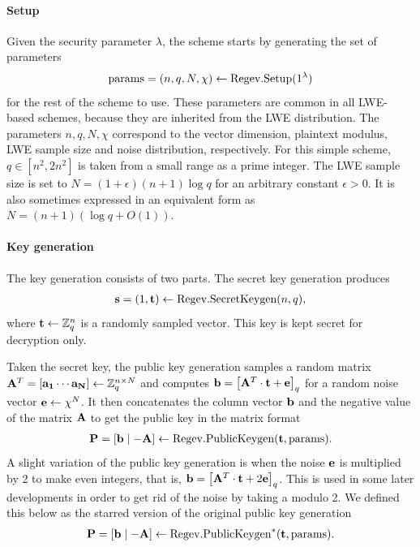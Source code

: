 \documentclass[../main.tex]{subfiles}
\begin{document}
\paragraph{Setup} Given the security parameter $\lambda$, the scheme starts by generating the set of parameters 
\begin{align*}
    \text{params}=(n,q,N,\chi) \leftarrow \text{Regev}.\text{Setup}(1^{\lambda})
\end{align*}
for the rest of the scheme to use. These parameters are common in all LWE-based schemes, because they are inherited from the LWE distribution. The parameters  $n,q,N,\chi$ correspond to the vector dimension, plaintext modulus, LWE sample size and noise distribution, respectively. For this simple scheme, $q \in [n^2, 2n^2]$ is taken from a small range as a prime integer. %
The LWE sample size is set to $N=(1+\epsilon)(n+1)\log q$ for an arbitrary constant $\epsilon >0$. It is also sometimes expressed in an equivalent form as $N=(n+1)(\log q+O(1))$.

\paragraph{Key generation} The key generation consists of two parts. The secret key generation produces 
\begin{align*}
    \mathbf{s}=(1,\mathbf{t}) \leftarrow \text{Regev}.\text{SecretKeygen}(n,q),
\end{align*}
where $\mathbf{t} \leftarrow \mathbb{Z}_q^n$ is a randomly sampled vector. This key is kept secret for decryption only. 

Taken the secret key, the public key generation samples a random matrix $\mathbf{A}^T = \left[\mathbf{a_1} \cdots \mathbf{a_N}\right] \leftarrow \mathbb{Z}_q^{n \times N}$ and computes $\mathbf{b} = \left[{\mathbf{A}^T \cdot \mathbf{t} + \mathbf{e}}\right]_q$ for a random noise vector $\mathbf{e} \leftarrow \chi^N$. It then concatenates the column vector $\mathbf{b}$ and the negative value of the matrix $\mathbf{A}$ to get the public key in the matrix format 
\begin{align*}
    \mathbf{P}=[\mathbf{b} \mid -\mathbf{A}] \leftarrow \text{Regev}.\text{PublicKeygen}(\mathbf{t},\text{params}).
\end{align*}
A slight variation of the public key generation is when the noise $\mathbf{e}$ is multiplied by 2 to make even integers, that is, $\mathbf{b} = \left[{\mathbf{A}^T \cdot \mathbf{t} + 2\mathbf{e}}\right]_q$. This is used in some later developments in order to get rid of the noise by taking a modulo 2. We defined this below as the starred version of the original public key generation
\begin{align*}
    \mathbf{P}=[\mathbf{b} \mid -\mathbf{A}] \leftarrow \text{Regev}.\text{PublicKeygen}^*(\mathbf{t},\text{params}).
\end{align*}
\end{document}

